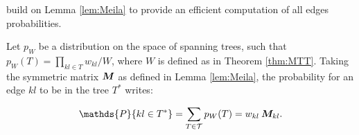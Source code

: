 \cite{kirshner} build on Lemma \ref{lem:Meila} to provide an efficient computation of all edges probabilities.
\begin{lemma}  \label{lem:Kirshner}
    Let $p_W$ be a distribution on the space of spanning trees, such that $p_W(T)=\prod_{kl\in T} w_{kl} / W$, where $W$ is defined as in Theorem \ref{thm:MTT}. Taking the symmetric matrix ${\boldsymbol{M}}$ as defined in Lemma  \ref{lem:Meila}, the probability for an edge $kl$ to be in the tree $T^*$ writes:
 
$$\mathds{P}\{kl\in T^*\} = \sum_{T\in \mathcal{T}} p_W(T)= w_{kl}\: \Mbf_{kl}.$$
\end{lemma}

